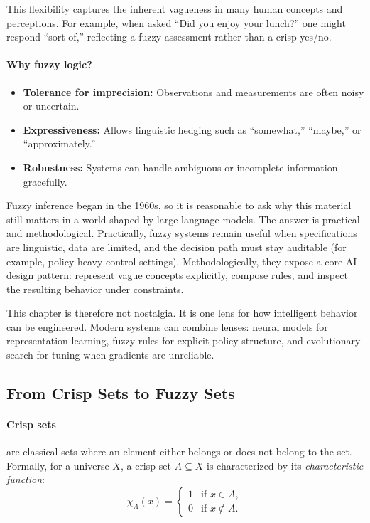 This flexibility captures the inherent vagueness in many human concepts and perceptions. For example, when asked ``Did you enjoy your lunch?'' one might respond ``sort of,'' reflecting a fuzzy assessment rather than a crisp yes/no.

\paragraph{Why fuzzy logic?}
\begin{itemize}
    \item \textbf{Tolerance for imprecision:} Observations and measurements are often noisy or uncertain.
    \item \textbf{Expressiveness:} Allows linguistic hedging such as ``somewhat,'' ``maybe,'' or ``approximately.''
    \item \textbf{Robustness:} Systems can handle ambiguous or incomplete information gracefully.
\end{itemize}

\begin{tcolorbox}[summarybox, title={Author's note: why study fuzzy systems now?}]
Fuzzy inference began in the 1960s, so it is reasonable to ask why this material still matters in a world shaped by large language models. The answer is practical and methodological. Practically, fuzzy systems remain useful when specifications are linguistic, data are limited, and the decision path must stay auditable (for example, policy-heavy control settings). Methodologically, they expose a core AI design pattern: represent vague concepts explicitly, compose rules, and inspect the resulting behavior under constraints.
\par\smallskip
This chapter is therefore not nostalgia. It is one lens for how intelligent behavior can be engineered. Modern systems can combine lenses: neural models for representation learning, fuzzy rules for explicit policy structure, and evolutionary search for tuning when gradients are unreliable.
\end{tcolorbox}

\subsection{From Crisp Sets to Fuzzy Sets}
\label{sec:softcomp_from_crisp_sets_to_fuzzy_sets}

\paragraph{Crisp sets} are classical sets where an element either belongs or does not belong to the set. Formally, for a universe \(X\), a crisp set \(A \subseteq X\) is characterized by its \emph{characteristic function}:
\begin{equation}
\chi_A(x) = \begin{cases}
1 & \text{if } x \in A, \\
0 & \text{if } x \notin A.
\end{cases}
\label{eq:softcomp_characteristic_function}
\end{equation}

